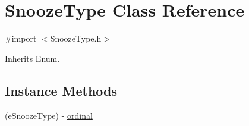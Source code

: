 \hypertarget{interface_snooze_type}{}\section{Snooze\+Type Class Reference}
\label{interface_snooze_type}


{\ttfamily \#import $<$Snooze\+Type.\+h$>$}



Inherits Enum.

\subsection*{Instance Methods}
\begin{DoxyCompactItemize}
\item 
(e\+Snooze\+Type) -\/ \hyperlink{interface_snooze_type_a4f4c625d8ac23d2c34437a92d2034d19}{ordinal}
\end{DoxyCompactItemize}
